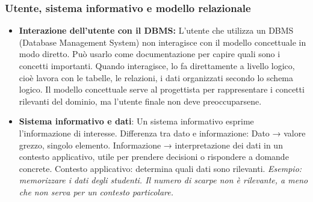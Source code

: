 \documentclass{article}
\begin{document}
\subsubsection{Utente, sistema informativo e modello relazionale}\begin{itemize}


\item\textbf{Interazione dell’utente con il DBMS:} L’utente che utilizza un DBMS (Database Management System) non interagisce con il modello concettuale in modo diretto. Può usarlo come documentazione per capire quali sono i concetti importanti. Quando interagisce, lo fa direttamente a livello logico, cioè lavora con le tabelle, le relazioni, i dati organizzati secondo lo schema logico. Il modello concettuale serve al progettista per rappresentare i concetti rilevanti del dominio, ma l’utente
finale non deve preoccuparsene.

\item\textbf{Sistema informativo e dati}: Un sistema informativo esprime l’informazione di interesse. Differenza tra dato e informazione: Dato → valore grezzo, singolo elemento. Informazione → interpretazione dei dati in un contesto applicativo, utile per prendere decisioni o
rispondere a domande concrete. Contesto applicativo: determina quali dati sono rilevanti. \textit{Esempio: memorizzare i dati degli studenti. Il numero di scarpe non è rilevante, a meno che non serva per un contesto particolare.}


\end{itemize}
\end{document}
